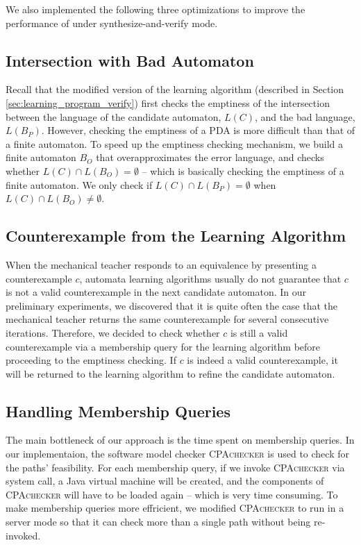 We also implemented the following three optimizations to improve the performance of \PACMAN under synthesize-and-verify mode.

\subsection{Intersection with Bad Automaton}\label{subsec:intersection_B}

Recall that the modified version of the learning algorithm (described in Section \ref{sec:learning_program_verify}) first checks the emptiness of the intersection between the language of the candidate automaton, $L(C)$, and the bad language, $L(B_P)$. However, checking the emptiness of a PDA is more difficult than that of a finite automaton. To speed up the emptiness checking mechanism, we build a finite automaton $B_O$ that overapproximates the error language, and checks whether $L(C) \cap L(B_O) = \emptyset$ -- which is basically checking the emptiness of a finite automaton. We only check if $L(C) \cap L(B_P) = \emptyset$ when $L(C) \cap L(B_O) \neq \emptyset$. 

\subsection{Counterexample from the Learning Algorithm}\label{subsec:cex_learning_alg}

When the mechanical teacher responds to an equivalence by presenting a counterexample $c$, automata learning algorithms usually do not guarantee that $c$ is not a valid counterexample in the next candidate automaton. In our preliminary experiments, we discovered that it is quite often the case that the mechanical teacher returns the same counterexample for several consecutive iterations. Therefore, we decided to check whether $c$ is still a valid counterexample via a membership query for the learning algorithm before proceeding to the emptiness checking. If $c$ is indeed a valid counterexample, it will be returned to the learning algorithm to refine the candidate automaton. 

\subsection{Handling Membership Queries}\label{subsec:handle_mem}

The main bottleneck of our approach is the time spent on membership queries. In our implementaion, the software model checker \textsc{CPAchecker} is used to check for the paths' feasibility. For each membership query, if we invoke \textsc{CPAchecker} via system call, a Java virtual machine will be created, and the components of \textsc{CPAchecker} will have to be loaded again -- which is very time consuming. To make membership queries more effricient, we modified \textsc{CPAchecker} to run in a server mode so that it can check more than a single path without being re-invoked. 